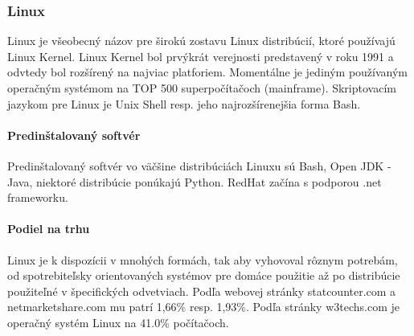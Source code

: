 \subsubsection{Linux}
\indent  Linux je všeobecný názov pre širokú zostavu Linux distribúcií, ktoré používajú Linux Kernel. Linux Kernel bol prvýkrát verejnosti predstavený v roku 1991 a odvtedy bol rozšírený na najviac platforiem. Momentálne je jediným používaným operačným systémom na TOP 500 superpočítačoch (mainframe). Skriptovacím jazykom pre Linux je Unix Shell resp. jeho najrozšírenejšia forma Bash.
\paragraph{Predinštalovaný softvér}
\indent Predinštalovaný softvér vo väčšine distribúciách Linuxu sú Bash, Open JDK - Java, niektoré distribúcie ponúkajú Python. RedHat začína s podporou .net frameworku.
\paragraph{Podiel na trhu}
\indent Linux je k dispozícii v mnohých formách, tak aby vyhovoval rôznym potrebám, od spotrebiteľsky orientovaných systémov pre domáce použitie až po distribúcie použiteľné v špecifických odvetviach. Podľa webovej stránky statcounter.com\cite{statcounter} a netmarketshare.com\cite{netmarketshare} mu patrí 1,66\% resp.  1,93\%.
Podľa stránky w3techs.com\cite{pop} je operačný systém Linux na 41.0\% počítačoch.
